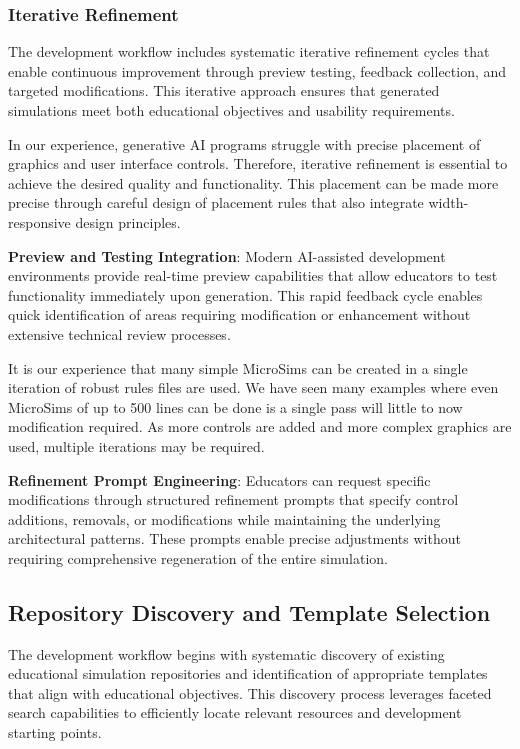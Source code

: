 \subsubsection{Iterative Refinement}

The development workflow includes systematic iterative refinement cycles that enable continuous improvement through preview testing, feedback collection, and targeted modifications. This iterative approach ensures that generated simulations meet both educational objectives and usability requirements.

In our experience, generative AI programs struggle with precise placement of graphics and user interface controls. Therefore, iterative refinement is essential to achieve the desired quality and functionality.  This placement can be made more precise through careful design of placement rules that also integrate width-responsive design principles.

\textbf{Preview and Testing Integration}: Modern AI-assisted development environments provide real-time preview capabilities that allow educators to test functionality immediately upon generation. This rapid feedback cycle enables quick identification of areas requiring modification or enhancement without extensive technical review processes.

It is our experience that many simple MicroSims can be created in a single iteration of robust rules files are used.  We have seen many examples where even MicroSims of up to 500 lines can be done is a single pass will little to now modification required.  As more controls are added and more complex graphics are used, multiple iterations may be required.

\textbf{Refinement Prompt Engineering}: Educators can request specific modifications through structured refinement prompts that specify control additions, removals, or modifications while maintaining the underlying architectural patterns. These prompts enable precise adjustments without requiring comprehensive regeneration of the entire simulation.

\subsection{Repository Discovery and Template Selection}

The development workflow begins with systematic discovery of existing educational simulation repositories and identification of appropriate templates that align with educational objectives. This discovery process leverages faceted search capabilities to efficiently locate relevant resources and development starting points.

